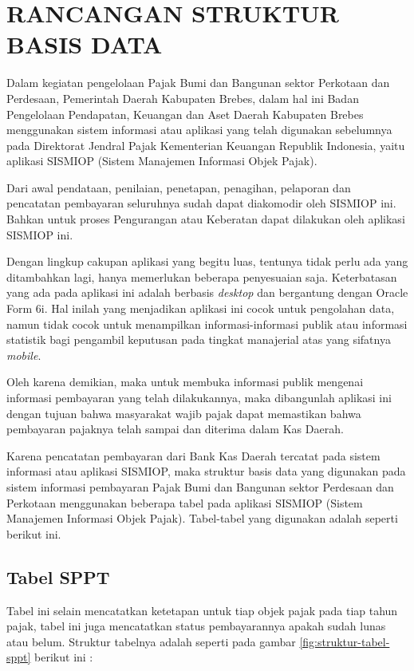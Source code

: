 \chapter{RANCANGAN STRUKTUR BASIS DATA}

Dalam kegiatan pengelolaan Pajak Bumi dan Bangunan sektor Perkotaan dan Perdesaan, Pemerintah Daerah Kabupaten Brebes, dalam hal ini Badan Pengelolaan Pendapatan, Keuangan dan Aset Daerah Kabupaten Brebes menggunakan sistem informasi atau aplikasi yang telah digunakan sebelumnya pada Direktorat Jendral Pajak Kementerian Keuangan Republik Indonesia, yaitu aplikasi SISMIOP (Sistem Manajemen Informasi Objek Pajak).

Dari awal pendataan, penilaian, penetapan, penagihan, pelaporan dan pencatatan pembayaran seluruhnya sudah dapat diakomodir oleh SISMIOP ini. Bahkan untuk proses Pengurangan atau Keberatan dapat dilakukan oleh aplikasi SISMIOP ini.

Dengan lingkup cakupan aplikasi yang begitu luas, tentunya tidak perlu ada yang ditambahkan lagi, hanya memerlukan beberapa penyesuaian saja. Keterbatasan yang ada pada aplikasi ini adalah berbasis \textit{desktop} dan bergantung dengan Oracle Form 6i. Hal inilah yang menjadikan aplikasi ini cocok untuk pengolahan data, namun tidak cocok untuk menampilkan informasi-informasi publik atau informasi statistik bagi pengambil keputusan pada tingkat manajerial atas yang sifatnya \textit{mobile}.

Oleh karena demikian, maka untuk membuka informasi publik mengenai informasi pembayaran yang telah dilakukannya, maka dibangunlah aplikasi ini dengan tujuan bahwa masyarakat wajib pajak dapat memastikan bahwa pembayaran pajaknya telah sampai dan diterima dalam Kas Daerah.

Karena pencatatan pembayaran dari Bank Kas Daerah tercatat pada sistem informasi atau aplikasi SISMIOP, maka struktur basis data yang digunakan pada sistem informasi pembayaran Pajak Bumi dan Bangunan sektor Perdesaan dan Perkotaan menggunakan beberapa tabel pada aplikasi SISMIOP (Sistem Manajemen Informasi Objek Pajak). Tabel-tabel yang digunakan adalah seperti berikut ini.

\section{Tabel SPPT}

Tabel ini selain mencatatkan ketetapan untuk tiap objek pajak pada tiap tahun pajak, tabel ini juga mencatatkan status pembayarannya apakah sudah lunas atau belum. Struktur tabelnya adalah seperti pada gambar \ref{fig:struktur-tabel-sppt} berikut ini :

